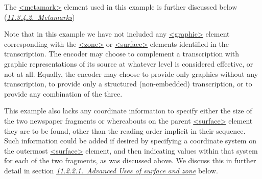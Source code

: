 The \hyperref[TEI.metamark]{<metamark>} element used in this example is further discussed below (\textit{\hyperref[PH-meta]{11.3.4.2.\ Metamarks}})\par
Note that in this example we have not included any \hyperref[TEI.graphic]{<graphic>} element corresponding with the \hyperref[TEI.zone]{<zone>} or \hyperref[TEI.surface]{<surface>} elements identified in the transcription. The encoder may choose to complement a transcription with graphic representations of its source at whatever level is considered effective, or not at all. Equally, the encoder may choose to provide only graphics without any transcription, to provide only a structured (non-embedded) transcription, or to provide any combination of the three.\par
This example also lacks any coordinate information to specify either the size of the two newspaper fragments or whereabouts on the parent \hyperref[TEI.surface]{<surface>} element they are to be found, other than the reading order implicit in their sequence. Such information could be added if desired by specifying a coordinate system on the outermost \hyperref[TEI.surface]{<surface>} element, and then indicating values within that system for each of the two fragments, as was discussed above. We discuss this in further detail in section \textit{\hyperref[PH-surfzone]{11.2.2.1.\ Advanced Uses of surface and zone}} below.
